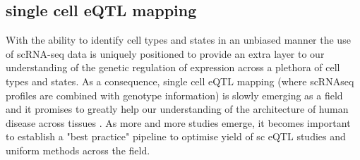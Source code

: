 

















\subsection{single cell eQTL mapping}

With the ability to identify cell types and states in an unbiased manner the use of scRNA-seq data is uniquely positioned to provide an extra layer to our understanding of the genetic regulation of expression across a plethora of cell types and states.
As a consequence, single cell eQTL mapping (where scRNAseq profiles are combined with genotype information) is slowly emerging as a field and it promises to greatly help our understanding of the architecture of human disease across tissues \cite{wills2013single, van2018single, kang2018multiplexed, sarkar2019discovery, cuomo2020single, jerber2020population, van2020single}.
As more and more studies emerge, it becomes important to establish a "best practice" pipeline to optimise yield of sc eQTL studies and uniform methods across the field.\\

